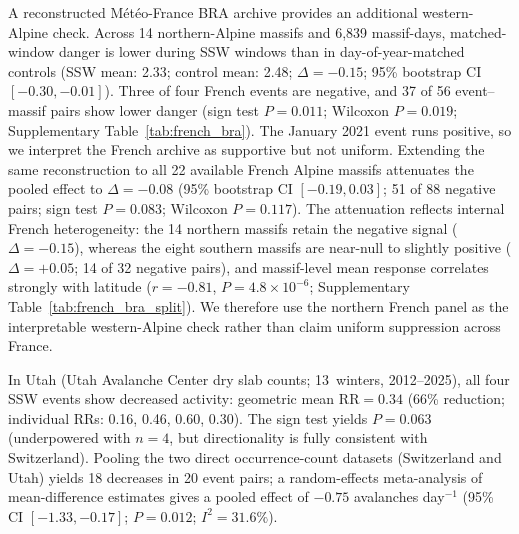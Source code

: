\documentclass[11pt,letterpaper]{article}
\begin{document}
A reconstructed M\'et\'eo-France BRA archive provides an additional western-Alpine check. Across 14 northern-Alpine massifs and 6{,}839 massif-days, matched-window danger is lower during SSW windows than in day-of-year-matched controls (SSW mean: 2.33; control mean: 2.48; $\Delta = -0.15$; 95\% bootstrap CI $[-0.30, -0.01]$). Three of four French events are negative, and 37 of 56 event--massif pairs show lower danger (sign test $P = 0.011$; Wilcoxon $P = 0.019$; Supplementary Table~\ref{tab:french_bra}). The January 2021 event runs positive, so we interpret the French archive as supportive but not uniform. Extending the same reconstruction to all 22 available French Alpine massifs attenuates the pooled effect to $\Delta = -0.08$ (95\% bootstrap CI $[-0.19, 0.03]$; 51 of 88 negative pairs; sign test $P = 0.083$; Wilcoxon $P = 0.117$). The attenuation reflects internal French heterogeneity: the 14 northern massifs retain the negative signal ($\Delta = -0.15$), whereas the eight southern massifs are near-null to slightly positive ($\Delta = +0.05$; 14 of 32 negative pairs), and massif-level mean response correlates strongly with latitude ($r = -0.81$, $P = 4.8 \times 10^{-6}$; Supplementary Table~\ref{tab:french_bra_split}). We therefore use the northern French panel as the interpretable western-Alpine check rather than claim uniform suppression across France.

In Utah (Utah Avalanche Center dry slab counts; 13~winters, 2012--2025), all four SSW events show decreased activity: geometric mean $\mathrm{RR} = 0.34$ (66\% reduction; individual RRs: 0.16, 0.46, 0.60, 0.30). The sign test yields $P = 0.063$ (underpowered with $n = 4$, but directionality is fully consistent with Switzerland). Pooling the two direct occurrence-count datasets (Switzerland and Utah) yields 18 decreases in 20 event pairs; a random-effects meta-analysis of mean-difference estimates gives a pooled effect of $-0.75$ avalanches day$^{-1}$ (95\% CI $[-1.33, -0.17]$; $P = 0.012$; $I^2 = 31.6\%$).
\end{document}
